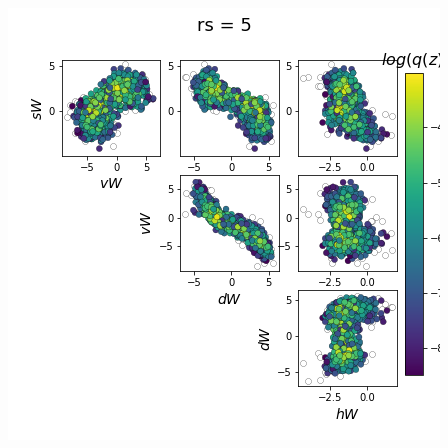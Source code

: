 \documentclass[11pt]{article}
\begin{document}
\begin{center}
\includegraphics[scale=0.33]{figs/Z_SC_pvar_reduced_c=0_p=50_rs=5.png}
\end{center}
\end{document}
